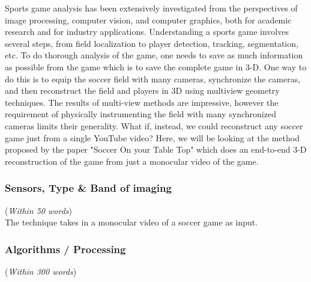 \documentclass[11pt]{article}
\begin{document}
Sports game analysis has been extensively
investigated from the perspectives of image processing,
computer vision, and computer graphics, both for
academic research and for industry applications. Understanding
a sports game involves several steps, from field
localization to player detection, tracking, segmentation, etc.
To do thorough analysis of the game, one needs to save as much information as possible from the game which is to save the complete game in 3-D.
One way to do this is to equip the
soccer field with many cameras, synchronize the cameras,
and then reconstruct the field and players in 3D using multiview
geometry techniques. The results
of multi-view methods are impressive, however the requirement
of physically instrumenting the field with many
synchronized cameras limits their generality. What if, instead,
we could reconstruct any soccer game just from a
single YouTube video? Here, we will be looking at the method proposed by the paper "Soccer On your Table Top" which does an end-to-end 3-D reconstruction of the game from just a monocular video of the game.

\subsubsection{Sensors, Type \& Band of imaging}
({\em Within 50 words}) \\

The technique takes in a monocular video of a soccer game as input.

\subsubsection{Algorithms / Processing} 
({\em Within 300 words})\\
\end{document}
